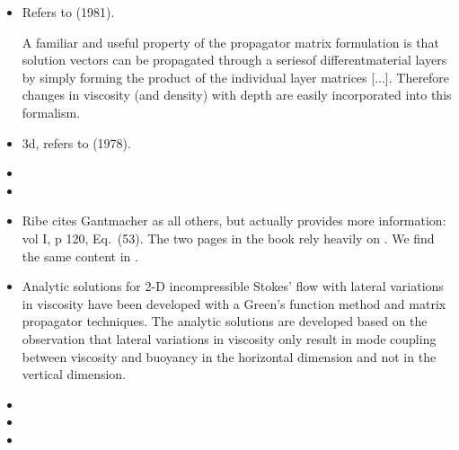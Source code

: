 \begin{itemize}
\item {}

Refers to \textcite{haoc81} (1981). 

\begin{displayquote}
{\color{darkgray}
A familiar and useful property of the propagator matrix
formulation is that solution vectors can be propagated
through a seriesof differentmaterial layers by simply forming
the product of the individual layer matrices [...].
Therefore changes in viscosity (and density) with depth are
easily incorporated into this formalism.
}
\end{displayquote}


\item {}

3d, refers to \textcite{haoc78} (1978).

\item {}

\item {}

\item {}

Ribe cites Gantmacher as all others, but actually provides 
more information: vol I, p 120, Eq.~(53).
The two pages in the book rely heavily on \cite{haoc81}.
We find the same content in \cite{ribe07}. 

\item {}

\begin{displayquote}
{\color{darkgray}
Analytic solutions for 2-D incompressible Stokes' flow with lateral variations in
viscosity have been developed with a Green’s function method and matrix propagator
techniques. The analytic solutions are developed based on the observation that lateral
variations in viscosity only result in mode coupling between viscosity and buoyancy in
the horizontal dimension and not in the vertical dimension.
}
\end{displayquote}

\item {}

\item {}

\item {}


\end{itemize}
